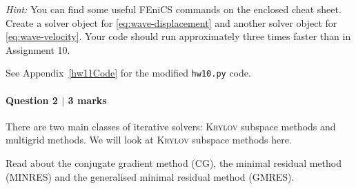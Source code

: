 \begin{enumerate}[(a)]
\emph{Hint:} You can find some useful \textsf{FEniCS} commands on the enclosed cheat sheet. Create a solver object for \eqref{eq:wave-displacement} and another solver object for \eqref{eq:wave-velocity}. Your code should run approximately three times faster than in Assignment 10.

\vspace{0.25cm}
\begin{solution}
See Appendix~\ref{hw11Code} for the modified \texttt{hw10.py} code.
\end{solution}

\end{enumerate}

\newpage
\paragraph*{Question 2 $\vert$ 3 marks}%

There are two main classes of iterative solvers: \textsc{Krylov} subspace methods and multigrid methods. We will look at \textsc{Krylov} subspace methods here.

Read about the conjugate gradient method (CG), the minimal residual method (MINRES) and the generalised minimal residual method (GMRES).

